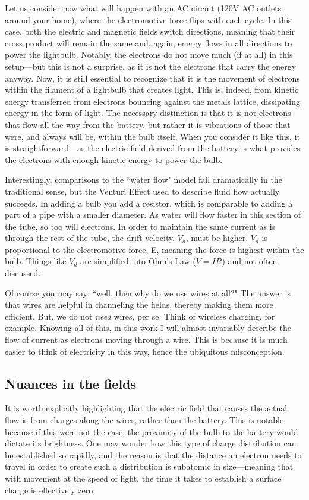 \documentclass[12pt]{report}
\begin{document}
Let us consider now what will happen with an AC circuit (120V AC outlets around your home), where the electromotive force flips with each cycle. In this case, both the electric and magnetic fields switch directions, meaning that their cross product will remain the same and, again, energy flows in all directions to power the lightbulb. Notably, the electrons do not move much (if at all) in this setup---but this is not a surprise, as it is not the electrons that carry the energy anyway. Now, it is still essential to recognize that it is the movement of electrons within the filament of a lightbulb that creates light. This is, indeed, from kinetic energy transferred from electrons bouncing against the metals lattice, dissipating energy in the form of light. The necessary distinction is that it is not electrons that flow all the way from the battery, but rather it is vibrations of those that were, and always will be, within the bulb itself. When you consider it like this, it is straightforward---as the electric field derived from the battery is what provides the electrons with enough kinetic energy to power the bulb.\newline

Interestingly, comparisons to the ``water flow" model fail dramatically in the traditional sense, but the Venturi Effect used to describe fluid flow actually succeeds. In adding a bulb you add a resistor, which is comparable to adding a part of a pipe with a smaller diameter. As water will flow faster in this section of the tube, so too will electrons. In order to maintain the same current as is through the rest of the tube, the drift velocity, $V_d$, must be higher. $V_d$ is proportional to the electromotive force, E, meaning the force is highest within the bulb. Things like $V_d$ are simplified into Ohm's Law ($V = IR$) and not often discussed.\newline 

Of course you may say: ``well, then why do we use wires at all?" The answer is that wires are helpful in channeling the fields, thereby making them more efficient. But, we do not \textit{need} wires, per se. Think of wireless charging, for example. Knowing all of this, in this work I will almost invariably describe the flow of current as electrons moving through a wire. This is because it is much easier to think of electricity in this way, hence the ubiquitous misconception. 

\subsection{Nuances in the fields} It is worth explicitly highlighting that the electric field that causes the actual flow is from charges along the wires, rather than the battery. This is notable because if this were not the case, the proximity of the bulb to the battery would dictate its brightness. One may wonder how this type of charge distribution can be established so rapidly, and the reason is that the distance an electron needs to travel in order to create such a distribution is subatomic in size---meaning that with movement at the speed of light, the time it takes to establish a surface charge is effectively zero.\newline
\end{document}
